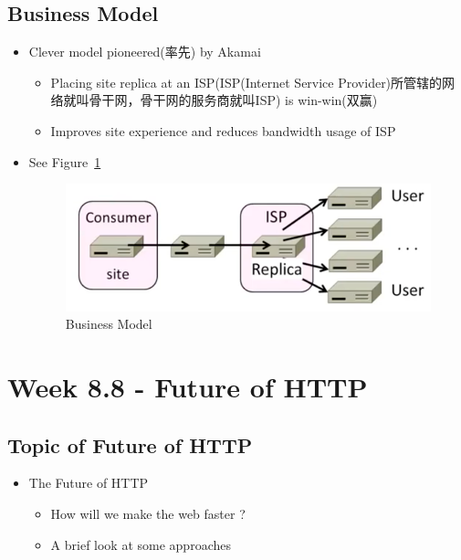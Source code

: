 \documentclass[12pt]{ctexart}   %
\begin{document}
	\subsection{Business Model}
	\begin{itemize}
		\item Clever model pioneered(率先) by Akamai
		\begin{itemize}
			\item Placing site replica at an ISP(ISP(Internet Service Provider)所管辖的网络就叫骨干网，骨干网的服务商就叫ISP) is win-win(双赢)
			\item Improves site experience and reduces bandwidth usage of ISP
		\end{itemize}
		\item See Figure~\ref{fig:8-7-7}
		  
		 \begin{figure}[h!] %
		\centering
		 \includegraphics[scale=0.7]{images/8-7-7}
		\caption{ Business Model }
		 \label{fig:8-7-7}
		 \end{figure}
	\end{itemize}
	
\section{Week 8.8 - Future of HTTP}
	\subsection{Topic of Future of HTTP}
	\begin{itemize}
		\item The Future of HTTP
		\begin{itemize}
			\item How will we make the web faster ?
			\item A brief look at some approaches
		\end{itemize}
	\end{itemize}
	
\end{document}
